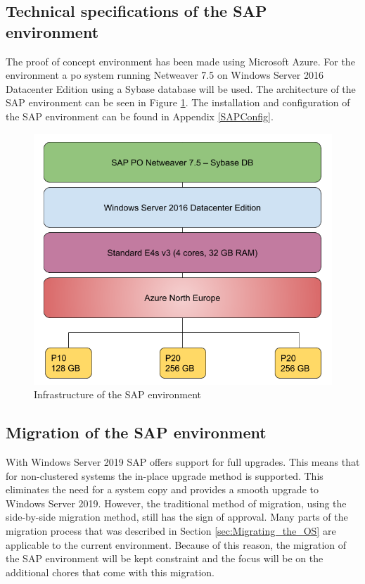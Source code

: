 \subsection{Technical specifications of the SAP environment}
The proof of concept environment has been made using Microsoft Azure. 
For the environment a \acrfull{po} system running Netweaver 7.5 on Windows Server 2016 Datacenter Edition using a Sybase database will be used. 
The architecture of the SAP environment can be seen in Figure \ref{fig:SAPInfra}.
The installation and configuration of the SAP environment can be found in Appendix \ref{SAPConfig}.

\begin{figure}[h]
	\captionsetup{width=0.8\linewidth}
	\includegraphics[width=0.9\linewidth]{img/Methodologie/SAP_PO.png}
	\centering
	\caption[SAP Infrastructure]{Infrastructure of the SAP environment}
	\label{fig:SAPInfra}	
\end{figure}

\subsection{Migration of the SAP environment}
With Windows Server 2019 SAP offers support for full upgrades. 
This means that for non-clustered systems the in-place upgrade method is supported.
This eliminates the need for a system copy and provides a smooth upgrade to Windows Server 2019. 
However, the traditional method of migration, using the side-by-side migration method, still has the sign of approval. 
Many parts of the migration process that was described in Section \ref{sec:Migrating_the_OS} are applicable to the current environment. 
Because of this reason, the migration of the SAP environment will be kept constraint and the focus will be on the additional chores that come with this migration.

